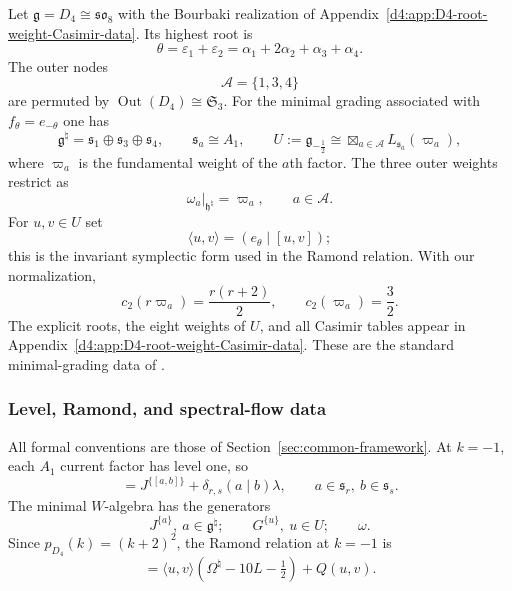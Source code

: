 \documentclass[11pt,reqno]{amsart}
\theoremstyle{definition}
\theoremstyle{remark}
\begin{document}
Let $\mathfrak g=D_4\cong\mathfrak{so}_8$ with the Bourbaki realization of
Appendix~\ref{d4:app:D4-root-weight-Casimir-data}.  Its highest root is
\begin{equation}
 \theta=\varepsilon_1+\varepsilon_2
 =\alpha_1+2\alpha_2+\alpha_3+\alpha_4.
 \label{d4:eq:D4-highest-root}
\end{equation}
The outer nodes
\begin{equation}
 \mathcal A=\{1,3,4\}
 \label{d4:eq:D4-outer-node-index-set}
\end{equation}
are permuted by $\operatorname{Out}(D_4)\cong\mathfrak S_3$.  For the
minimal grading associated with $f_\theta=e_{-\theta}$ one has
\begin{equation*}
 \mathfrak g^\natural
 =\mathfrak s_1\oplus\mathfrak s_3\oplus\mathfrak s_4,
 \qquad \mathfrak s_a\cong A_1,
 \qquad
 U:=\mathfrak g_{-\frac12}
 \cong\boxtimes_{a\in\mathcal A}L_{\mathfrak s_a}(\varpi_a),
\end{equation*}
where $\varpi_a$ is the fundamental weight of the $a$th factor.  The three
outer weights restrict as
\begin{equation}
 \omega_a|_{\mathfrak h^\natural}=\varpi_a,
 \qquad a\in\mathcal A.
 \label{d4:eq:D4-outer-weight-restrictions}
\end{equation}
For $u,v\in U$ set
\begin{equation}
 \langle u,v\rangle=(e_\theta\mid[u,v]);
 \label{d4:eq:D4-symplectic-form}
\end{equation}
this is the invariant symplectic form used in the Ramond relation.  With our
normalization,
\begin{equation}
 c_2(r\varpi_a)=\frac{r(r+2)}2,
 \qquad c_2(\varpi_a)=\frac32.
 \label{d4:eq:D4-A1-Casimir-formula}
\end{equation}
The explicit roots, the eight weights of $U$, and all Casimir tables appear
in Appendix~\ref{d4:app:D4-root-weight-Casimir-data}.  These are the standard
minimal-grading data of \cite{KacRoanWakimoto2003,KacWakimoto2004,
AdamovicKacMosenederFrajriaPapiPerse2018}.

\subsubsection{Level, Ramond, and spectral-flow data}


All formal conventions are those of Section~\ref{sec:common-framework}.  At
$k=-1$, each $A_1$ current factor has level one, so
\begin{equation}
 [J^{\{a\}}{}_{\lambda}J^{\{b\}}]
 =J^{\{[a,b]\}}+\delta_{r,s}(a\mid b)\lambda,
 \qquad a\in\mathfrak s_r,\ b\in\mathfrak s_s.
 \label{d4:eq:D4-A1-current-relation-level-minus-one}
\end{equation}
The minimal $W$-algebra has the generators
\begin{equation}
 J^{\{a\}},\ a\in\mathfrak g^\natural;
 \qquad G^{\{u\}},\ u\in U;
 \qquad \omega.
 \label{d4:eq:D4-minimal-W-generators}
\end{equation}
Since $p_{D_4}(k)=(k+2)^2$, the Ramond relation at $k=-1$ is
\begin{equation*}
 [u,v]=\langle u,v\rangle(\Omega^\natural-10L-\tfrac12)+Q(u,v).
\end{equation*}
\end{document}
